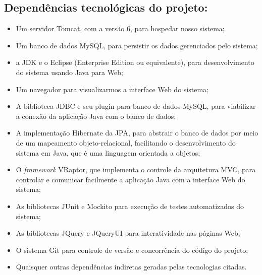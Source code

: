 \documentclass[11pt, a4paper]{article}
\begin{document}
        \subsection{Dependências tecnológicas do projeto:}
            \begin{itemize}
                \item Um servidor Tomcat, com a versão 6, para hospedar nosso
                sistema;
                
                \item Um banco de dados MySQL, para persistir os dados
                gerenciados pelo sistema;
                
                \item a JDK e o Eclipse (Enterprise Edition ou equivalente),
                para desenvolvimento do sistema usando Java para Web;
                
                \item Um navegador para visualizarmos a interface Web do 
                sistema;
                
                \item A biblioteca JDBC e seu plugin para banco de dados MySQL, para viabilizar a conexão da aplicação Java com o banco de dados;
                
                \item A implementação Hibernate da JPA, para abstrair o banco de
                dados por meio de um mapeamento objeto-relacional, facilitando
                o desenvolvimento do sistema em Java, que é uma linguagem
                orientada a objetos;
                
                \item O \emph{framework} VRaptor, que implementa o controle da arquitetura MVC, para controlar e comunicar facilmente a aplicação Java com a interface Web do sistema;
                
                \item As bibliotecas JUnit e Mockito para execução de testes automatizados do sistema;
				
				\item As bibliotecas JQuery e JQueryUI para interatividade nas
				páginas Web;
                
                \item O sistema Git para controle de versão e concorrência do código do projeto;
                
                \item Quaisquer outras dependências indiretas geradas pelas
                tecnologias citadas.
            \end{itemize}
\end{document}
